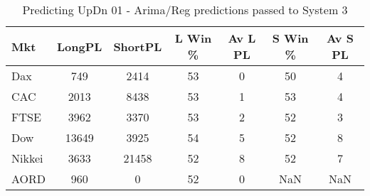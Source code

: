\begin{table}[ht]
\centering
\caption[Predicting UpDn 01 - Arima/Reg predictions passed to System 3.]{Predicting UpDn 01 - Arima/Reg predictions passed to System 3} 
\label{tab:chp_ts:01_arima_reg_sys}
\begin{tabular}{lcccccc}
  \toprule Mkt & LongPL & ShortPL & L Win \% & Av L PL & S Win \% & Av S PL \\ 
  \midrule Dax & 749 & 2414 & 53 & 0 & 50 & 4 \\ 
  CAC & 2013 & 8438 & 53 & 1 & 53 & 4 \\ 
  FTSE & 3962 & 3370 & 53 & 2 & 52 & 3 \\ 
  Dow & 13649 & 3925 & 54 & 5 & 52 & 8 \\ 
  Nikkei & 3633 & 21458 & 52 & 8 & 52 & 7 \\ 
  AORD & 960 & 0 & 52 & 0 & NaN & NaN \\ 
   \bottomrule \end{tabular}
\end{table}
